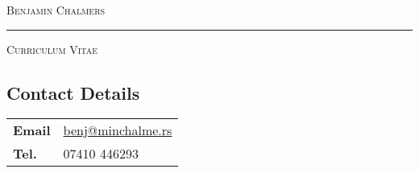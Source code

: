 \documentclass[9pt,a4paper]{article}
\begin{document}
\begin{center}

  \textsc{\Huge{Benjamin Chalmers}}
  \vspace{0.3cm}

  \noindent\rule{0.8\textwidth}{0.4pt}
  \vspace{0.3cm}

  \textsc{\large{Curriculum Vitae}}
  \vspace{0.2cm}

\end{center}
\begin{multicols*}{2}
  \section*{Contact Details} 
\begin{center}
  \begin{tabular}{p{1.2cm}p{6cm}}
    \textbf{Email}&\href{mailto:benj@minchalme.rs}{benj@minchalme.rs}\\
    \textbf{Tel.}&07410 446293\\
  \end{tabular}
\end{center}


\end{multicols*}
\end{document}
